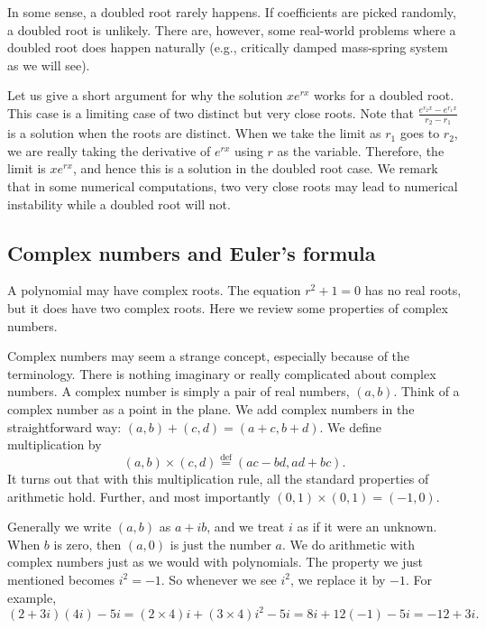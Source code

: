 In some sense, a doubled root rarely happens.  If coefficients are 
picked randomly, a doubled root is unlikely.
There are, however, some real-world problems
where a doubled root does happen naturally (e.g., critically damped
mass-spring system as we will see).

Let us give a short argument for why the solution $x e^{r x}$ works for a
doubled root.
This case is a limiting case of
two distinct but very close roots.  Note that 
$\frac{e^{r_2 x} - e^{r_1 x}}{r_2 - r_1}$ is a solution when the roots are
distinct.  When we take the limit as $r_1$ goes to $r_2$, we are really
taking the
derivative of $e^{rx}$ using $r$ as the variable.  Therefore, the limit is 
$x e^{rx}$, and hence this is a solution in the doubled root case.
We remark that in some numerical computations,
two very close roots may lead to numerical instability while
a doubled root will not.

\subsection{Complex numbers and Euler's formula}

A polynomial may have complex roots.  The
equation $r^2 + 1 = 0$ has no real roots, but it does have two complex roots.
Here we review some properties of complex numbers.

Complex numbers may seem a strange concept, especially because of the
terminology.  There is nothing imaginary or really complicated about complex
numbers.
A complex number is simply a pair of real numbers, $(a,b)$.  
Think of a complex number as a point in the plane.  We add complex numbers
in the straightforward way: $(a,b)+(c,d)=(a+c,b+d)$.  We define
multiplication by
\begin{equation*}
(a,b) \times (c,d) \overset{\text{def}}{=} (ac-bd,ad+bc) .
\end{equation*}
It turns out that with this multiplication rule, all the standard properties
of arithmetic hold.  Further, and most importantly $(0,1) \times (0,1) =
(-1,0)$.

Generally we write $(a,b)$ as $a+ib$, and we treat $i$ as if it were an
unknown.  When $b$ is zero, then $(a,0)$ is just the number $a$.
We do arithmetic with complex numbers just as we would
with polynomials.
The property we just mentioned becomes $i^2 = -1$.
So whenever we see $i^2$, we replace it by $-1$.
For example,
\begin{equation*}
(2+3i)(4i) - 5i = 
(2\times 4)i + (3 \times 4) i^2 - 5i
=
8i + 12 (-1) - 5i
=
-12 + 3i .
\end{equation*}

